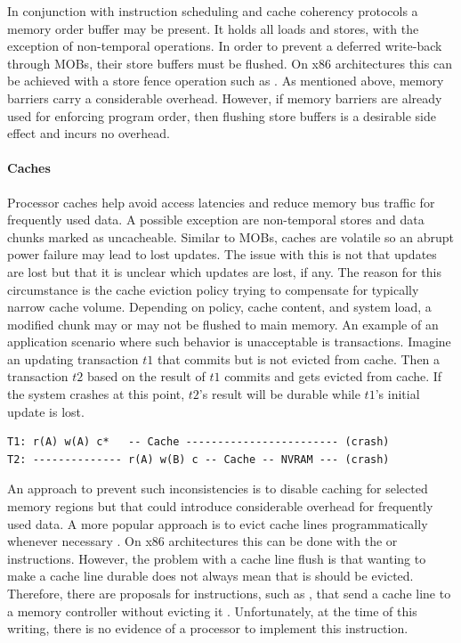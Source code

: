 In conjunction with instruction scheduling and cache coherency protocols a
memory order buffer may be present. It holds all loads and stores, with the
exception of non-temporal operations. In order to prevent a deferred write-back
through \acp{MOB}, their store buffers must be flushed. On x86
architectures this can be achieved with a store fence operation such as
. As mentioned above, memory barriers carry a considerable
overhead. However, if memory barriers are already used for enforcing program
order, then flushing store buffers is a desirable side effect and incurs no
overhead.

\paragraph{Caches}

Processor caches help avoid access latencies and reduce memory bus traffic for
frequently used data. A possible exception are non-temporal stores and data
chunks marked as uncacheable. Similar to \acp{MOB}, caches are
volatile so an abrupt power failure may lead to lost updates. The issue with
this is not that updates are lost but that it is unclear which updates are lost,
if any. The reason for this circumstance is the cache eviction policy trying to
compensate for typically narrow cache volume. Depending on policy, cache
content, and system load, a modified chunk may or may not be flushed to main
memory. An example of an application scenario where such behavior is
unacceptable is transactions. Imagine an updating transaction $t1$ that commits
but is not evicted from cache. Then a transaction $t2$ based on the result of
$t1$ commits and gets evicted from cache. If the system crashes at this point,
$t2$'s result will be durable while $t1$'s initial update is lost.


\begin{lstlisting}
T1: r(A) w(A) c*   -- Cache ------------------------ (crash)
T2: -------------- r(A) w(B) c -- Cache -- NVRAM --- (crash)
\end{lstlisting}

An approach to prevent such inconsistencies is to disable caching for selected
memory regions but that could introduce considerable overhead for frequently
used data. A more popular approach is to evict cache lines programmatically
whenever necessary \cite{condit2009better, dulloor2014system, oukid2017data}. On
x86 architectures this can be done with the  or 
instructions. However, the problem with a cache line flush is that wanting to
make a cache line durable does not always mean that is should be evicted.
Therefore, there are proposals for instructions, such as , that send
a cache line to a memory controller without evicting it \cite{kolli2016high,
oukid2017data}. Unfortunately, at the time of this writing, there is no evidence
of a processor to implement this instruction.


